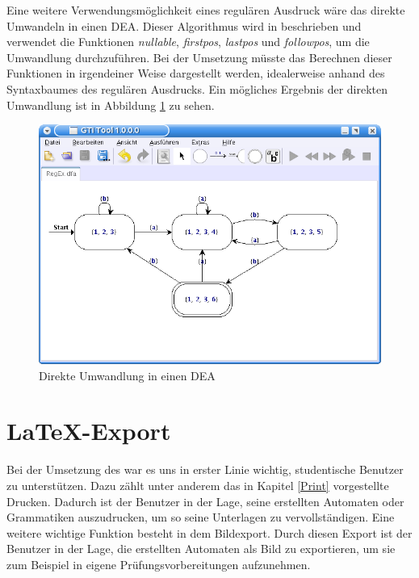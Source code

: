 Eine weitere Verwendungsmöglichkeit eines regulären Ausdruck wäre das direkte
Umwandeln in einen DEA. Dieser Algorithmus wird in
\cite[S. 175ff]{Compilers} beschrieben und verwendet die Funktionen
\textit{nullable}, \textit{firstpos}, \textit{lastpos} und \textit{followpos},
um die Umwandlung durchzuführen. Bei der Umsetzung müsste das Berechnen dieser
Funktionen in irgendeiner Weise dargestellt werden, idealerweise anhand des
Syntaxbaumes des regulären Ausdrucks. Ein mögliches Ergebnis der direkten
Umwandlung ist in Abbildung \ref{FigureRegExDFA} zu sehen.\vspace{10pt}

\begin{figure}[h!]
\begin{center}
\includegraphics[width=12cm]{../images/regex_dfa.png}
\caption{Direkte Umwandlung in einen DEA}
\label{FigureRegExDFA}
\end{center}
\end{figure}
\vspace{10pt}


\section{\LaTeX-Export}\label{PerspectiveLaTeX}

Bei der Umsetzung des \gtitools war es uns in erster Linie wichtig, studentische
Benutzer zu unterstützen. Dazu zählt unter anderem das in Kapitel \ref{Print}
vorgestellte Drucken. Dadurch ist der Benutzer in der Lage, seine erstellten
Automaten oder Grammatiken auszudrucken, um so seine Unterlagen zu
vervollständigen. Eine weitere wichtige Funktion besteht in dem Bildexport.
Durch diesen Export ist der Benutzer in der Lage, die erstellten Automaten als
Bild zu exportieren, um sie zum Beispiel in eigene Prüfungsvorbereitungen
aufzunehmen.\vspace{10pt}

